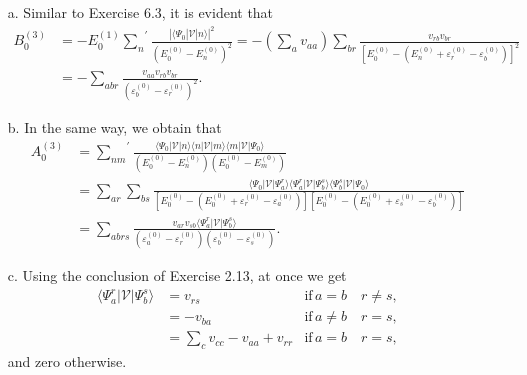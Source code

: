 \documentclass[a4paper]{book}
\newcounter{solution}[chapter]
\begin{document}
	\begin{solution}
	
	\begin{itemize}
	
	\item[a.] Similar to Exercise 6.3, it is evident that
	\begin{align*}
		B^{(3)}_0 &= - E^{(1)}_0 { \sum_n }^\prime \frac{|\langle \Psi_0 | \mathscr{V} | n \rangle |^2}{(E^{(0)}_0-E^{(0)}_n)^2} = - \left( \sum_{a} v_{aa} \right) \sum_{br} \frac{ v_{rb} v_{br}}{[ E^{(0)}_0- ( E^{(0)}_n + \varepsilon^{(0)}_r - \varepsilon^{(0)}_b ) ]^2} \\
		&= - \sum_{abr} \frac{ v_{aa} v_{rb} v_{br}}{( \varepsilon^{(0)}_b - \varepsilon^{(0)}_r)^2}.
	\end{align*}

	\item[b.] In the same way, we obtain that
	\begin{align*}
		A^{(3)}_0 &= { \sum_{nm} }^\prime \frac{\langle \Psi_0 | \mathscr{V} | n \rangle \langle n | \mathscr{V} | m \rangle \langle m | \mathscr{V} | \Psi_0 \rangle}{(E^{(0)}_0-E^{(0)}_n)(E^{(0)}_0-E^{(0)}_m)} \\
		&= \sum_{ar} \sum_{bs} \frac{\langle \Psi_0 | \mathscr{V} | \Psi^r_a \rangle \langle \Psi^r_a | \mathscr{V} | \Psi^s_b \rangle \langle \Psi^s_b | \mathscr{V} | \Psi_0 \rangle}{ [ E^{(0)}_0 - ( E^{(0)}_0 + \varepsilon^{(0)}_r - \varepsilon^{(0)}_a ) ][ E^{(0)}_0 - ( E^{(0)}_0 + \varepsilon^{(0)}_s - \varepsilon^{(0)}_b ) ]}  \\
		&= \sum_{abrs} \frac{v_{ar} v_{sb} \langle \Psi^r_a | \mathscr{V} | \Psi^s_b \rangle}{( \varepsilon^{(0)}_a - \varepsilon^{(0)}_r)( \varepsilon^{(0)}_b - \varepsilon^{(0)}_s)}.
	\end{align*}
	
	\item[c.] Using the conclusion of Exercise 2.13, at once we get
	\begin{align*}
		\langle \Psi^r_a | \mathscr{V} | \Psi^s_b \rangle &= v_{rs} & \text{if} \, a = b  \quad r \neq s, \\
		&= - v_{ba} & \text{if} \, a \neq b \quad r = s, \\
		&= \sum_{c} v_{cc} - v_{aa} + v_{rr} & \text{if} \, a = b \quad r = s ,
	\end{align*}
	and zero otherwise.
	

\end{itemize}
\end{solution}
\end{document}
